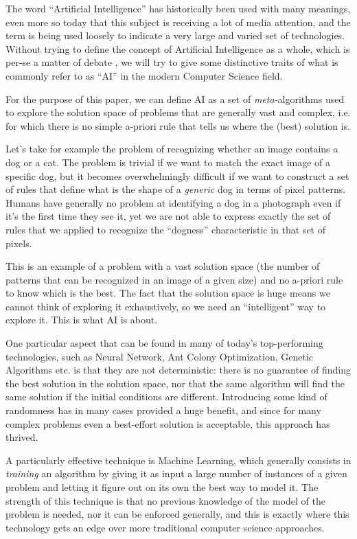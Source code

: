 \documentclass[conference]{IEEEtran}
\newcommand{\cit}[1][]{\todo[tickmarkheight=0.2cm]{cit #1}}
\begin{document}
The word ``Artificial Intelligence'' has historically been used with many meanings, even more so today that this subject is receiving a lot of media attention, and the term is being used loosely to indicate a very large and varied set of technologies. Without trying to define the concept of Artificial Intelligence as a whole, which is per-se a matter of debate \cit, we will try to give some distinctive traits of what is commonly refer to as ``AI'' in the modern Computer Science field.

For the purpose of this paper, we can define AI as a set of \textit{meta-}algorithms used to explore the solution space of problems that are generally vast and complex, i.e. for which there is no simple a-priori rule that tells us where the (best) solution is.

Let's take for example the problem of recognizing whether an image contains a dog or a cat. The problem is trivial if we want to match the exact image of a specific dog, but it becomes overwhelmingly difficult if we want to construct a set of rules that define what is the shape of a \textit{generic} dog in terms of pixel patterns. Humans have generally no problem at identifying a dog in a photograph even if it's the first time they see it, yet we are not able to express exactly the set of rules that we applied to recognize the ``dogness'' characteristic in that set of pixels.

This is an example of a problem with a vast solution space (the number of patterns that can be recognized in an image of a given size) and no a-priori rule to know which is the best. The fact that the solution space is huge means we cannot think of exploring it exhaustively, so we need an ``intelligent'' way to explore it. This is what AI is about.

One particular aspect that can be found in many of today's top-performing technologies, such as Neural Network, Ant Colony Optimization, Genetic Algorithms etc. is that they are not deterministic: there is no guarantee of finding the best solution in the solution space, nor that the same algorithm will find the same solution if the initial conditions are different. Introducing some kind of randomness has in many cases provided a huge benefit, and since for many complex problems even a best-effort solution is acceptable, this approach has thrived.

A particularly effective technique is Machine Learning, which generally consists in
\textit{training} an algorithm by giving it as input a large number of
instances of a given problem and letting it figure out on its own the best way
to model it. The strength of this technique is that no previous knowledge of
the model of the problem is needed, nor it can be enforced generally, and this
is exactly where this technology gets an edge over more traditional computer
science approaches.
\end{document}
